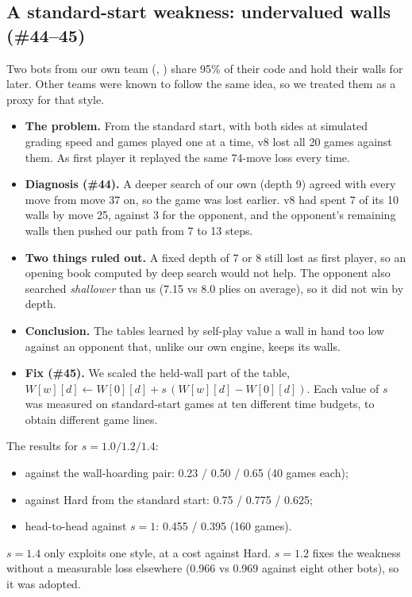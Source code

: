 \subsection{A standard-start weakness: undervalued walls (\#44--45)}
\label{sec:walls}
Two bots from our own team (, ) share 95\% of their code and hold
their walls for later. Other teams were known to follow the same idea, so we treated them as a
proxy for that style.
\begin{itemize}
  \item \textbf{The problem.} From the standard start, with both sides at simulated grading speed
        and games played one at a time, v8 lost all 20 games against them. As first player it
        replayed the same 74-move loss every time.
  \item \textbf{Diagnosis (\#44).} A deeper search of our own (depth 9) agreed with every move
        from move 37 on, so the game was lost earlier. v8 had spent 7 of its 10 walls by move 25,
        against 3 for the opponent, and the opponent's remaining walls then pushed our path from 7
        to 13 steps.
  \item \textbf{Two things ruled out.} A fixed depth of 7 or 8 still lost as first player, so an
        opening book computed by deep search would not help. The opponent also searched
        \emph{shallower} than us (7.15 vs 8.0 plies on average), so it did not win by depth.
  \item \textbf{Conclusion.} The tables learned by self-play value a wall in hand too low against
        an opponent that, unlike our own engine, keeps its walls.
  \item \textbf{Fix (\#45).} We scaled the held-wall part of the table,
        $W[w][d] \leftarrow W[0][d] + s\,(W[w][d]-W[0][d])$. Each value of $s$ was measured on
        standard-start games at ten different time budgets, to obtain different game lines.
\end{itemize}
The results for $s = 1.0 / 1.2 / 1.4$:
\begin{itemize}
  \item against the wall-hoarding pair: 0.23 / 0.50 / 0.65 (40 games each);
  \item against Hard from the standard start: 0.75 / 0.775 / 0.625;
  \item head-to-head against $s=1$: 0.455 / 0.395 (160 games).
\end{itemize}
$s=1.4$ only exploits one style, at a cost against Hard. $s=1.2$ fixes the weakness without a
measurable loss elsewhere (0.966 vs 0.969 against eight other bots), so it was adopted.

